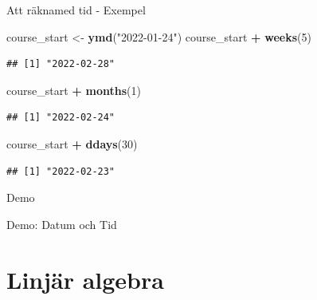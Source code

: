 \documentclass[
  11pt,
  ignorenonframetext,
  handout]{beamer}
\newenvironment{Shaded}{\begin{snugshade}}{\end{snugshade}}
\newcommand{\DecValTok}[1]{\textcolor[rgb]{0.00,0.00,0.81}{#1}}
\newcommand{\FunctionTok}[1]{\textcolor[rgb]{0.13,0.29,0.53}{\textbf{#1}}}
\newcommand{\NormalTok}[1]{#1}
\newcommand{\OtherTok}[1]{\textcolor[rgb]{0.56,0.35,0.01}{#1}}
\newcommand{\SpecialCharTok}[1]{\textcolor[rgb]{0.81,0.36,0.00}{\textbf{#1}}}
\newcommand{\StringTok}[1]{\textcolor[rgb]{0.31,0.60,0.02}{#1}}
\begin{document}
\begin{frame}[fragile]{Att räknamed tid - Exempel}
\protect{}\label{att-ruxe4knamed-tid---exempel}
\begin{Shaded}
\begin{Highlighting}[]
\NormalTok{course\_start }\OtherTok{\textless{}{-}} \FunctionTok{ymd}\NormalTok{(}\StringTok{"2022{-}01{-}24"}\NormalTok{)}
\NormalTok{course\_start }\SpecialCharTok{+} \FunctionTok{weeks}\NormalTok{(}\DecValTok{5}\NormalTok{)}
\end{Highlighting}
\end{Shaded}

\begin{verbatim}
## [1] "2022-02-28"
\end{verbatim}

\begin{Shaded}
\begin{Highlighting}[]
\NormalTok{course\_start }\SpecialCharTok{+} \FunctionTok{months}\NormalTok{(}\DecValTok{1}\NormalTok{)}
\end{Highlighting}
\end{Shaded}

\begin{verbatim}
## [1] "2022-02-24"
\end{verbatim}

\begin{Shaded}
\begin{Highlighting}[]
\NormalTok{course\_start }\SpecialCharTok{+} \FunctionTok{ddays}\NormalTok{(}\DecValTok{30}\NormalTok{)}
\end{Highlighting}
\end{Shaded}

\begin{verbatim}
## [1] "2022-02-23"
\end{verbatim}
\end{frame}

\begin{frame}{Demo}
\protect{}\label{demo-1}
\begin{block}{Demo: Datum och Tid}
\protect{}\label{demo-datum-och-tid}
\end{block}
\end{frame}

\section{Linjär algebra}\label{linjuxe4r-algebra}
\end{document}
